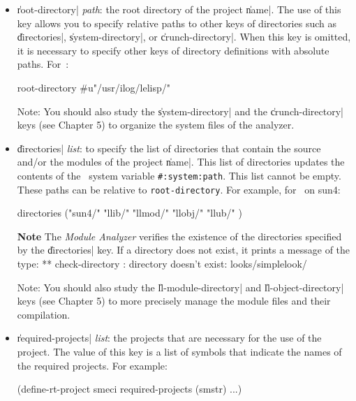 \begin{itemize}

\item {\Large \|root-directory| {\em path}}: the root directory of the project \|name|. The use of this key allows you to specify relative paths to other keys of directories such as \|directories|, \|system-directory|, or \|crunch-directory|.  When this key is omitted, it is necessary to specify other keys of directory definitions with absolute paths.  For \LeLisp\,:  

\begin{Code*}
  root-directory #u"/usr/ilog/lelisp/"
\end{Code*}

Note:  You should also study the \|system-directory| and the \|crunch-directory| keys (see Chapter 5) to organize the system files of the analyzer.

\item {\Large \|directories| {\em list}}: to specify the list of directories that contain the source and/or the modules of the project \|name|.
This list of directories updates the contents of the \LeLisp\ system variable {\tt \#:system:path}.  This list cannot be empty.  These paths can be relative to {\tt root-directory}.  For example, for \LeLisp\ on sun4: 

\begin{Code*}
  directories ("sun4/"
               "llib/"
               "llmod/"
               "llobj/"
               "llub/"
               )
\end{Code*}

\begin{Side}{\bf Note}
The {\em Module Analyzer} verifies the existence of the directories specified by the \|directories| key.  If a directory does not exist, it prints a message of the type:
\BeginLL
** check-directory : directory doesn't exist: looks/simplelook/
\EndLL
\end{Side}

Note:  You should also study the \|ll-module-directory| and \|ll-object-directory| keys (see Chapter 5) to more precisely manage the module files and their compilation. 

\item {\Large \|required-projects| {\em list}}: the projects that are necessary for the use of the project.  The value of this key is a list of symbols that indicate the names of the required projects.  For example:

\begin{Code*}
(define-rt-project smeci
   required-projects (smstr)
   ...)
\end{Code*}


\end{itemize}
